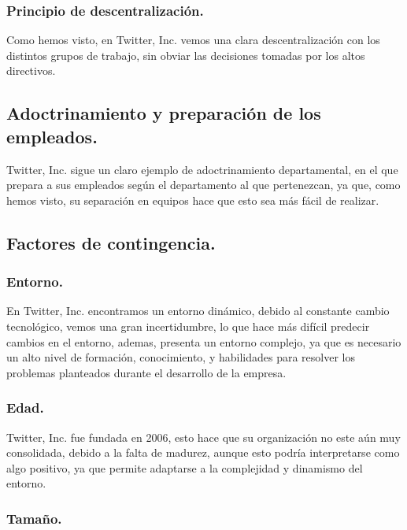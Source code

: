 \subsubsection{Principio de descentralización.}

Como hemos visto, en Twitter, Inc. vemos una clara descentralización con los distintos grupos de trabajo, sin obviar las decisiones tomadas por los altos directivos.

\subsection{Adoctrinamiento y preparación de los empleados.}

Twitter, Inc. sigue un claro ejemplo de adoctrinamiento departamental, en el que prepara a sus empleados según el departamento al que pertenezcan, ya que, como hemos visto, su separación en equipos hace que esto sea más fácil de realizar.


\subsection{Factores de contingencia.}

\subsubsection{Entorno.}

En Twitter, Inc. encontramos un entorno dinámico, debido al constante cambio tecnológico, vemos una gran incertidumbre, lo que hace más difícil predecir cambios en el entorno, ademas, presenta un entorno complejo, ya que es necesario un alto nivel de formación, conocimiento, y habilidades para resolver los problemas planteados durante el desarrollo de la empresa.

\subsubsection{Edad.}

Twitter, Inc. fue fundada en 2006, esto hace que su organización no este aún muy consolidada, debido a la falta de madurez, aunque esto podría interpretarse como algo positivo, ya que permite adaptarse a la complejidad y dinamismo del entorno.

\subsubsection{Tamaño.}

